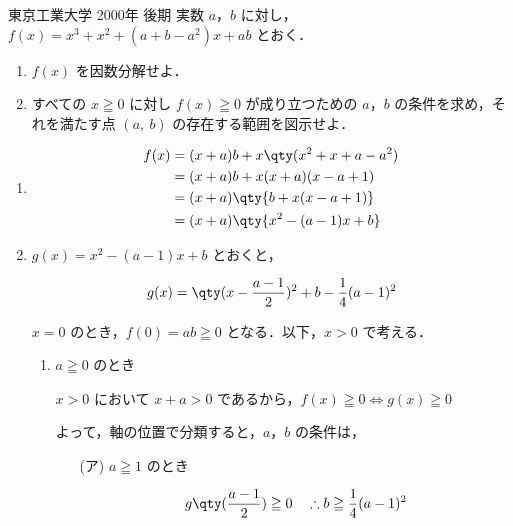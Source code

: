 \documentclass[a4paper]{ltjsarticle}
\begin{document}

\begin{itembox}[l]{東京工業大学 2000年 後期}
    実数 $a$，$b$ に対し，$f(x)=x^3+x^2+(a+b-a^2)x+ab$ とおく．

    \begin{enumerate}[label=(\arabic*)]
        \item $f(x)$ を因数分解せよ．

        \item すべての $x\geqq 0$ に対し $f(x)\geqq 0$ が成り立つための $a$，$b$ の条件を求め，それを満たす点 $(a,\ b)$ の存在する範囲を図示せよ．
    \end{enumerate}
\end{itembox}

\begin{enumerate}[label=(\arabic*)]
    \item
          \begin{align*}
              f(x) & =(x+a)b+x\qty(x^2+x+a-a^2) \\
                   & =(x+a)b+x(x+a)(x-a+1)      \\
                   & =(x+a)\qty{b+x(x-a+1)}     \\
                   & =(x+a)\qty{x^2-(a-1)x+b}
          \end{align*}

    \item $g(x)=x^2-(a-1)x+b$ とおくと，

          \begin{equation*}
              g(x)=\qty(x-\frac{a-1}{2})^2+b-\frac{1}{4}(a-1)^2
          \end{equation*}

          $x=0$ のとき，$f(0)=ab\geqq 0$ となる．以下，$x>0$ で考える．

          \begin{enumerate}[label=(\roman*)]
              \item $a\geqq 0$ のとき

                    $x>0$ において $x+a>0$ であるから，$f(x)\geqq 0 \Longleftrightarrow g(x)\geqq 0$

                    よって，軸の位置で分類すると，$a$，$b$ の条件は，

                    \begin{itemize}
                        \item[(ア)] $a\geqq 1$ のとき

                            \begin{equation*}
                                g\qty(\frac{a-1}{2})\geqq 0 \quad \therefore b\geqq \frac{1}{4}(a-1)^2
                            \end{equation*}


\end{itemize}
\end{enumerate}
\end{enumerate}
\end{document}
